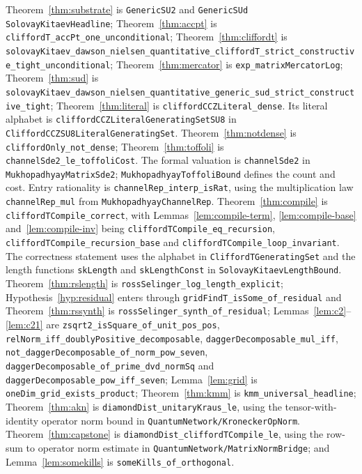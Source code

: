 \documentclass[aps,pra,reprint,nofootinbib,superscriptaddress]{revtex4-2}
\newcommand{\lean}[1]{\texttt{#1}}
\theoremstyle{plain}
\theoremstyle{definition}
\begin{document}
Theorem~\ref{thm:substrate} is \lean{GenericSU2} and \lean{GenericSUd}
\lean{SolovayKitaevHeadline}; Theorem~\ref{thm:accpt} is
\lean{cliffordT\_accPt\_one\_unconditional}; Theorem~\ref{thm:cliffordt} is
\lean{solovayKitaev\_dawson\_nielsen\_quantitative\_cliffordT\_strict\_constructive\_tight\_unconditional};
Theorem~\ref{thm:mercator} is \lean{exp\_matrixMercatorLog};
Theorem~\ref{thm:sud} is
\lean{solovayKitaev\_dawson\_nielsen\_quantitative\_generic\_sud\_strict\_constructive\_tight};
Theorem~\ref{thm:literal} is \lean{cliffordCCZLiteral\_dense}. Its literal
alphabet is \lean{cliffordCCZLiteralGeneratingSetSU8} in
\lean{CliffordCCZSU8LiteralGeneratingSet}.
Theorem~\ref{thm:notdense} is \lean{cliffordOnly\_not\_dense};
Theorem~\ref{thm:toffoli} is \lean{channelSde2\_le\_toffoliCost}. The
formal valuation is \lean{channelSde2} in \lean{MukhopadhyayMatrixSde2};
\lean{MukhopadhyayToffoliBound} defines the count and cost. Entry rationality
is \lean{channelRep\_interp\_isRat}, using the multiplication law
\lean{channelRep\_mul} from \lean{MukhopadhyayChannelRep}.
Theorem~\ref{thm:compile} is
\lean{cliffordTCompile\_correct}, with Lemmas~\ref{lem:compile-term},
\ref{lem:compile-base} and~\ref{lem:compile-inv} being
\lean{cliffordTCompile\_eq\_recursion},
\lean{cliffordTCompile\_recursion\_base} and
\lean{cliffordTCompile\_loop\_invariant}. The correctness statement uses
the alphabet in \lean{CliffordTGeneratingSet} and the length functions
\lean{skLength} and \lean{skLengthConst} in \lean{SolovayKitaevLengthBound}.
Theorem~\ref{thm:rslength} is \lean{rossSelinger\_log\_length\_explicit};
Hypothesis~\ref{hyp:residual} enters through
\lean{gridFindT\_isSome\_of\_residual} and Theorem~\ref{thm:rssynth} is
\lean{rossSelinger\_synth\_of\_residual}; Lemmas~\ref{lem:c2}--\ref{lem:c21} are
\lean{zsqrt2\_isSquare\_of\_unit\_pos\_pos},
\lean{relNorm\_iff\_doublyPositive\_decomposable},
\lean{daggerDecomposable\_mul\_iff},
\lean{not\_daggerDecomposable\_of\_norm\_pow\_seven},
\lean{daggerDecomposable\_of\_prime\_dvd\_normSq} and
\lean{daggerDecomposable\_pow\_iff\_seven};
Lemma~\ref{lem:grid} is \lean{oneDim\_grid\_exists\_product};
Theorem~\ref{thm:kmm} is \lean{kmm\_universal\_headline};
Theorem~\ref{thm:akn} is \lean{diamondDist\_unitaryKraus\_le}, using the
tensor-with-identity operator norm bound in \lean{QuantumNetwork/KroneckerOpNorm}.
Theorem~\ref{thm:capstone} is \lean{diamondDist\_cliffordTCompile\_le}, using
the row-sum to operator norm estimate in \lean{QuantumNetwork/MatrixNormBridge}; and
Lemma~\ref{lem:somekills} is \lean{someKills\_of\_orthogonal}.
\end{document}
